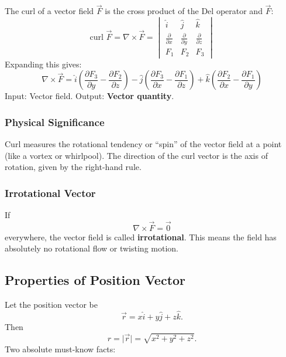 \documentclass[
]{article}
\begin{document}
The curl of a vector field \(\vec{F}\) is the cross product of the Del
operator and \(\vec{F}\):
\[
\text{curl }\vec{F} = \nabla \times \vec{F} =
\begin{vmatrix}
\hat{i} & \hat{j} & \hat{k} \\
\frac{\partial}{\partial x} & \frac{\partial}{\partial y} & \frac{\partial}{\partial z} \\
F_1 & F_2 & F_3
\end{vmatrix}
\]
Expanding this gives:
\[
\nabla \times \vec{F} = \hat{i}\left( \frac{\partial F_3}{\partial y} - \frac{\partial F_2}{\partial z} \right) - \hat{j}\left( \frac{\partial F_3}{\partial x} - \frac{\partial F_1}{\partial z} \right) + \hat{k}\left( \frac{\partial F_2}{\partial x} - \frac{\partial F_1}{\partial y} \right)
\]
Input: Vector field. Output: \textbf{Vector quantity}.

\subsubsection{Physical Significance}\label{physical-significance-1}

Curl measures the rotational tendency or ``spin'' of the vector field at
a point (like a vortex or whirlpool). The direction of the curl vector
is the axis of rotation, given by the right-hand rule.

\subsubsection{Irrotational Vector}\label{irrotational-vector}

If
\[
\nabla \times \vec{F} = \vec{0}
\]
everywhere, the vector field is called \textbf{irrotational}. This means
the field has absolutely no rotational flow or twisting motion.

\subsection{Properties of Position
Vector}\label{properties-of-position-vector}

Let the position vector be
\[
\vec{r} = x\hat{i} + y\hat{j} + z\hat{k}.
\]
Then
\[
r = \lvert \vec{r} \rvert = \sqrt{x^2 + y^2 + z^2}.
\]
Two absolute must-know facts:
\end{document}
